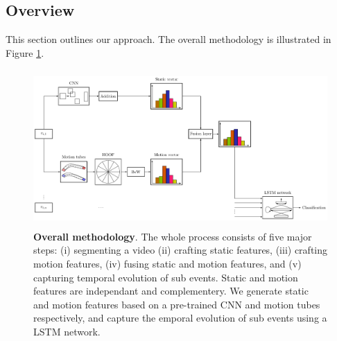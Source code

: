 
\subsection{Overview}

This section outlines our approach. The overall methodology is illustrated in Figure \ref{fi:test}.



\begin{figure}
  \centering
  \includegraphics[width=18cm, height=6cm]{overall.pdf} 
  \caption{\textbf{Overall methodology}. The whole process consists of five major steps: (i) segmenting a video (ii) crafting static features, (iii) crafting motion features,
  (iv) fusing static and motion features, and (v) capturing temporal evolution of sub events. Static and motion features are independant 
  and complementery. We generate static and motion features based on a pre-trained CNN and
  motion tubes respectively, and capture the emporal evolution of sub events using a LSTM network.}
  
 \label{fi:test}
\end{figure}


